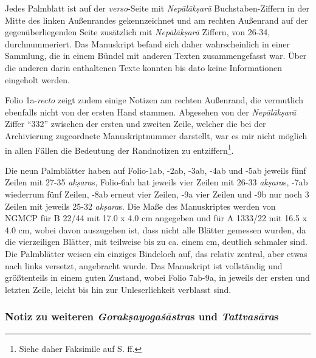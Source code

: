 \documentclass[a4paper,12pt]{article}
\begin{document}
{ Jedes Palmblatt ist auf der \textit{verso}-Seite mit \textit{Nepālākṣarā} Buchstaben-Ziffern in der Mitte des linken Außenrandes gekennzeichnet und am rechten Außenrand auf der gegenüberliegenden Seite zusätzlich mit \textit{Nepālākṣarā} Ziffern, von 26-34, durchnummeriert. Das Manuskript befand sich daher wahrscheinlich in einer Sammlung, die in einem Bündel mit anderen Texten zusammengefasst war. Über die anderen darin enthaltenen Texte konnten bis dato keine Informationen eingeholt werden.    

Folio 1a-\textit{recto} zeigt zudem einige Notizen am rechten Außenrand, die vermutlich ebenfalls nicht von der ersten Hand stammen. Abgesehen von der \textit{Nepālākṣarā} Ziffer ``332'' zwischen der ersten und zweiten Zeile, welcher die bei der Archivierung zugeordnete Manuskriptnummer darstellt, war es mir nicht möglich in allen Fällen die Bedeutung der Randnotizen zu entziffern\footnote{Siehe daher Faksimile auf S.\pageref{diped} ff.}.

Die neun Palmblätter haben auf Folio-1ab, -2ab, -3ab, -4ab und -5ab jeweils fünf Zeilen mit 27-35 \textit{akṣara}s, Folio-6ab hat jeweils vier Zeilen mit 26-33 \textit{akṣara}s, -7ab wiederrum fünf Zeilen, -8ab erneut vier Zeilen, -9a vier Zeilen und -9b nur noch 3 Zeilen mit jeweils 25-32 \textit{akṣara}s. Die Maße des Manuskriptes werden von NGMCP für B 22/44 mit 17.0 x 4.0 cm angegeben und für A 1333/22 mit 16.5 x 4.0 cm, wobei davon auszugehen ist, dass nicht alle Blätter gemessen wurden, da die vierzeiligen Blätter, mit teilweise bis zu ca. einem cm, deutlich schmaler sind. Die Palmblätter weisen ein einziges Bindeloch auf, das relativ zentral, aber etwas nach links versetzt, angebracht wurde. Das Manuskript ist vollständig und größtenteils in einem guten Zustand, wobei Folio 7ab-9a, in jeweils der ersten und letzten Zeile, leicht bis hin zur Unleserlichkeit verblasst sind.


\subsubsection{Notiz zu weiteren \textit{Gorakṣayogaśāstra}s und \textit{Tattvasāra}s}

}
\end{document}
